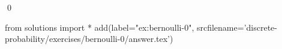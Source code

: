 
\begin{ex} 
  \label{ex:bernoulli-0}
  
  \qed
\end{ex} 
\begin{python0}
from solutions import *
add(label="ex:bernoulli-0",
    srcfilename='discrete-probability/exercises/bernoulli-0/answer.tex') 
\end{python0}
